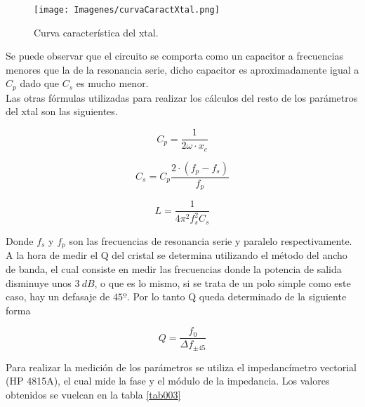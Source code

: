 \documentclass[a4paper,10pt]{article}
\begin{document}
		\begin{figure}[!htb]
			\centering
			\texttt{[image: Imagenes/curvaCaractXtal.png]}
			\caption{Curva característica del xtal.}
			\label{img005} 
		\end{figure}

		\indent Se puede observar que el circuito se comporta como un capacitor
		a frecuencias menores que la de la resonancia serie, dicho capacitor es 
		aproximadamente igual a $C_p$ dado que $C_s$ es mucho menor. \\
		\indent Las otras fórmulas utilizadas para realizar los cálculos del 
		resto de los parámetros del xtal son las siguientes.
	
		\begin{equation} \label{eq001}
			C_p = \frac{1}{2\omega\cdot x_c}		
		\end{equation}
		
		\begin{equation} \label{eq002}
			C_s = C_p \frac{2\cdot(f_p - f_s)}{f_p}
		\end{equation}

		\begin{equation} \label{eq003}
			L = \frac{1}{4\pi^2f_s^2C_s}
		\end{equation}

		\indent Donde $f_s$ y $f_p$ son las frecuencias de resonancia serie y 
		paralelo respectivamente. \\
		\indent A la hora de medir el Q del cristal se determina utilizando el 
		método del ancho de banda, el cual consiste en medir las frecuencias 
		donde la potencia de salida disminuye unos $3~dB$, o que es lo mismo, 
		si se trata de un polo simple como este caso, hay un defasaje de $45º$.
		Por lo tanto Q queda determinado de la siguiente forma
		
		\begin{equation} \label{eq004}
			Q = \frac{f_0}{\Delta f_{\pm45}}
		\end{equation}
		
		\indent Para realizar la medición de los parámetros se utiliza el 
		impedancímetro vectorial (HP 4815A), el cual mide la fase y el módulo de
		la impedancia. Los valores obtenidos se vuelcan en la tabla \ref{tab003}
		
\end{document}
